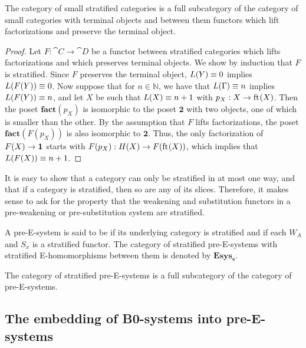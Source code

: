 \begin{lem}
The category of small stratified categories is a full subcategory of the category
of small categories with terminal objects and between them functors which lift 
factorizations and preserve the terminal object.
\end{lem}

\begin{proof}
Let $F:\cat{C}\to\cat{D}$ be a functor between stratified categories which lifts
factorizations and 
which preserves terminal objects. We show by induction that $F$ is stratified.
Since $F$ preserves the terminal object, $L(Y)\equiv 0$ implies $L(F(Y))\equiv 0$.
Now suppose that for $n\in\mathbb{N}$, we have that $L(\Gamma)\equiv n$ implies
$L(F(Y))\equiv n$, and let $X$ be such that $L(X)\equiv n+1$ with
$p_X:X\to\mathrm{ft}_{}(X)$. Then the poset $\mathbf{fact}(p_X)$ is isomorphic to the
poset $\mathbf{2}$ with two objects, one of which is smaller than the other. By the
assumption that $F$ lifts factorizations, the poset $\mathbf{fact}(F(p_X))$
is also isomorphic to $\mathbf{2}$. Thus, the only factorization
of $F(X)\to\mathbf{1}$ starts with $F(p_X):H(X)\to F(\mathrm{ft}_{}(X))$, which implies that
$L(F(X))\equiv n+1$. 
\end{proof}

\begin{rmk}
It is easy to show that a category can only be stratified in at most one way,
and that if a category is stratified, then so are any of its slices. Therefore,
it makes sense to ask for the property that the weakening and substitution
functors in a pre-weakening or pre-substitution system are stratified.
\end{rmk}

\begin{defn}
A pre-E-system is said to be  if its underlying category is
stratified and if each $W_A$ and $S_x$ is a stratified functor. The category of
stratified pre-E-systems with stratified E-homomorphisms between them is denoted by
$\mathbf{Esys_s}$.
\end{defn}

\begin{cor}\label{lem:strat_full}
The category of stratified pre-E-systems is a full subcategory of the category of
pre-E-systems.
\end{cor}

\subsection{The embedding of B0-systems into pre-E-systems}

